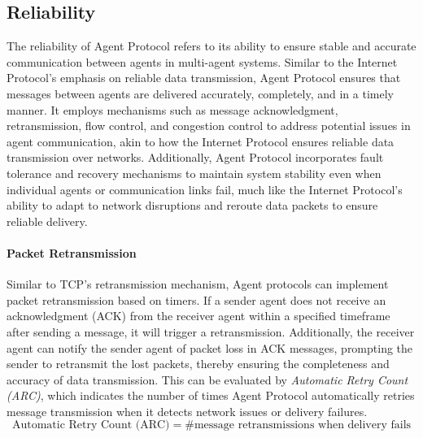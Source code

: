 \documentclass[10pt,preprint]{article}
\begin{document}
\subsection{Reliability}
The reliability of Agent Protocol refers to its ability to ensure stable and accurate communication between agents in multi-agent systems. Similar to the Internet Protocol's emphasis on reliable data transmission, Agent Protocol ensures that messages between agents are delivered accurately, completely, and in a timely manner. It employs mechanisms such as message acknowledgment, retransmission, flow control, and congestion control to address potential issues in agent communication, akin to how the Internet Protocol ensures reliable data transmission over networks. Additionally, Agent Protocol incorporates fault tolerance and recovery mechanisms to maintain system stability even when individual agents or communication links fail, much like the Internet Protocol's ability to adapt to network disruptions and reroute data packets to ensure reliable delivery.

\paragraph{Packet Retransmission} Similar to TCP's retransmission mechanism, Agent protocols can implement packet retransmission based on timers. If a sender agent does not receive an acknowledgment (ACK) from the receiver agent within a specified timeframe after sending a message, it will trigger a retransmission. Additionally, the receiver agent can notify the sender agent of packet loss in ACK messages, prompting the sender to retransmit the lost packets, thereby ensuring the completeness and accuracy of data transmission. This can be evaluated by \textit{Automatic Retry Count (ARC)}, which indicates the number of times Agent Protocol automatically retries message transmission when it detects network issues or delivery failures.
\begin{equation}
    \text{Automatic Retry Count (ARC)}=\#\text{message retransmissions when delivery fails}
\end{equation}
\end{document}

